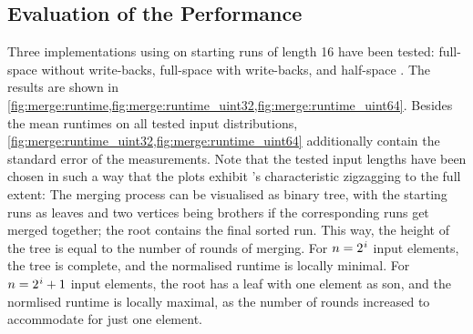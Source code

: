 \subsection*{Evaluation of the Performance}
\label{sec:tasklet:merge:performance}


Three implementations using \IS{} on starting runs of length 16 have been tested:
full-space \MS{} without write-backs, full-space \MS{} with write-backs, and half-space \MS{}.
The results are shown in \cref{fig:merge:runtime,fig:merge:runtime_uint32,fig:merge:runtime_uint64}.
Besides the mean runtimes on all tested input distributions, \cref{fig:merge:runtime_uint32,fig:merge:runtime_uint64} additionally contain the standard error of the measurements.
Note that the tested input lengths have been chosen in such a way that the plots exhibit \MS{}'s characteristic zigzagging to the full extent:
The merging process can be visualised as binary tree, with the starting runs as leaves and two vertices being brothers if the corresponding runs get merged together;
the root contains the final sorted run.
This way, the height of the tree is equal to the number of rounds of merging.
For \(n = 2\mspace{1mu}^i\) input elements, the tree is complete, and the normalised runtime is locally minimal.
For \(n = 2\mspace{1mu}^i + 1\) input elements, the root has a leaf with one element as son, and the normlised runtime is locally maximal, as the number of rounds increased to accommodate for just one element.


